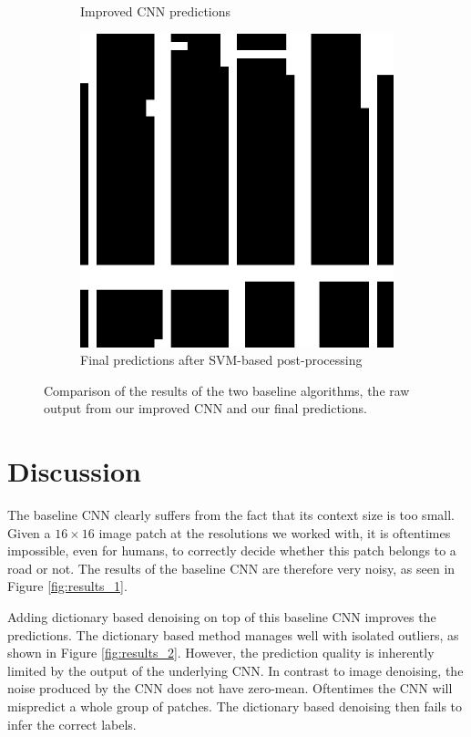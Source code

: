\documentclass[10pt,conference,compsocconf]{IEEEtran}
\begin{document}
\begin{figure}
\begin{subfigure}[t]{.19\textwidth}
		\caption{Improved CNN predictions}
		\label{fig:results_3}
	\end{subfigure}		
	\begin{subfigure}[t]{.19\textwidth}
		\includegraphics[width=1\textwidth]{figs/results_comparison/post_pro_final_8}
		\caption{Final predictions after SVM-based post-processing}
		\label{fig:results_4}
	\end{subfigure}	
	\caption{Comparison of the results of the two baseline algorithms, the raw output from our improved CNN and our final predictions.}	
	\label{fig:resuls}
\end{figure}

\section{Discussion}
\label{sec:discussion}
The baseline CNN clearly suffers from the fact that its context size is too small. Given a $ 16 \times 16 $ image patch at the resolutions we worked with, it is oftentimes impossible, even for humans, to correctly decide whether this patch belongs to a road or not. The results of the baseline CNN are therefore very noisy, as seen in Figure \ref{fig:results_1}.

\par 
Adding dictionary based denoising on top of this baseline CNN improves the predictions. The dictionary based method manages well with isolated outliers, as shown in Figure \ref{fig:results_2}. However, the prediction quality is inherently limited by the output of the underlying CNN. In contrast to image denoising, the noise produced by the CNN does not have zero-mean. Oftentimes the CNN will mispredict a whole group of patches. The dictionary based denoising then fails to infer the correct labels. 
\end{document}
